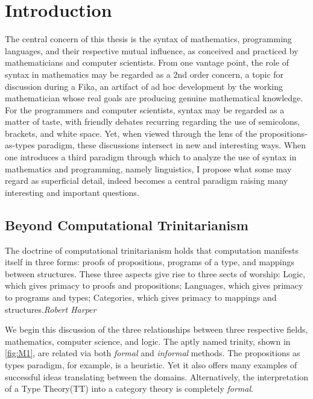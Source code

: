 \section{Introduction}
\label{sec:intro}

The central concern of this thesis is the syntax of mathematics, programming
languages, and their respective mutual influence, as conceived and practiced by
mathematicians and computer scientists.  From one vantage point, the role of
syntax in mathematics may be regarded as a 2nd order concern, a topic for
discussion during a Fika, an artifact of ad hoc development by the working
mathematician whose real goals are producing genuine mathematical knowledge.
For the programmers and computer scientists, syntax may be regarded as a
matter of taste, with friendly debates recurring regarding the use of
semicolons, brackets, and white space.  Yet, when viewed through the lens of
the propositions-as-types paradigm, these discussions intersect in new and
interesting ways.  When one introduces a third paradigm through which to
analyze the use of syntax in mathematics and programming, namely linguistics, I
propose what some may regard as superficial detail, indeed becomes a central
paradigm raising many interesting and important questions. 

\subsection{Beyond Computational Trinitarianism}

\begin{displayquote}

The doctrine of computational trinitarianism holds that computation manifests
itself in three forms: proofs of propositions, programs of a type, and mappings
between structures. These three aspects give rise to three sects of worship:
Logic, which gives primacy to proofs and propositions; Languages, which gives
primacy to programs and types; Categories, which gives primacy to mappings and
structures.\emph{Robert Harper} \cite{harperTrinity}
\end{displayquote}

We begin this discussion of the three relationships between three respective
fields, mathematics, computer science, and logic. The aptly named 
trinity, shown in \autoref{fig:M1}, are related via both \emph{formal} and \emph{informal}
methods. The propositions as types paradigm, for example, is a heuristic. Yet
it also offers many examples of successful ideas translating between the domains.
Alternatively, the interpretation of a Type Theory(TT) into a category theory is
completely \emph{formal}.

